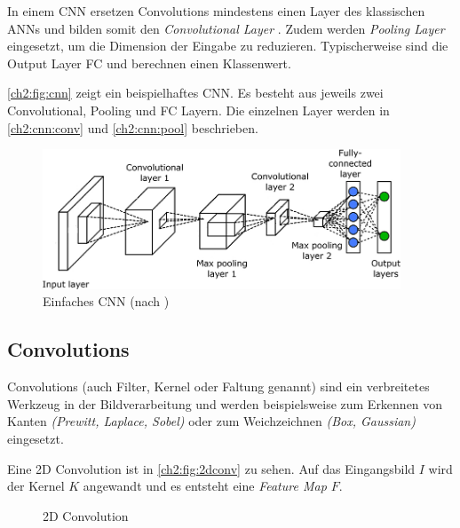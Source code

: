 \bigskip
In einem \ac{CNN} ersetzen Convolutions mindestens einen Layer des klassischen \ac{ANN}s und bilden somit den \textit{Convolutional Layer} \cite{goodfellow_deep_2016}.
Zudem werden \textit{Pooling Layer} eingesetzt, um die Dimension der Eingabe zu reduzieren.
Typischerweise sind die Output Layer \ac{FC} und berechnen einen Klassenwert.

\autoref{ch2:fig:cnn} zeigt ein beispielhaftes \ac{CNN}.
Es besteht aus jeweils zwei Convolutional, Pooling und \ac{FC} Layern.
Die einzelnen Layer werden in \autoref{ch2:cnn:conv} und \autoref{ch2:cnn:pool} beschrieben.

\begin{figure}[ht]
    \begin{small}
        \begin{center}
            \includegraphics[width=0.95\textwidth]{figures/simple_cnn}
        \end{center}
        \caption{Einfaches CNN (nach \cite{brilliant_convolutional_nodate})}
        \label{ch2:fig:cnn}
    \end{small}
\end{figure}


\subsection{Convolutions}
\label{ch2:cnn:conv}
Convolutions (auch Filter, Kernel oder Faltung genannt) sind ein verbreitetes Werkzeug in der Bildverarbeitung und werden beispielsweise zum Erkennen von Kanten \textit{(Prewitt, Laplace, Sobel)} oder zum Weichzeichnen \textit{(Box, Gaussian)} eingesetzt.

Eine 2D Convolution ist in \autoref{ch2:fig:2dconv} zu sehen.
Auf das Eingangsbild $I$ wird der Kernel $K$ angewandt und es entsteht eine \textit{Feature Map $F$}.

\begin{figure}[ht]
    \begin{small}
        \begin{center}
            
        \end{center}
        \caption{2D Convolution \cite{velickovic_petarv-/tikz_2019}}
        \label{ch2:fig:2dconv}
    \end{small}
\end{figure}

